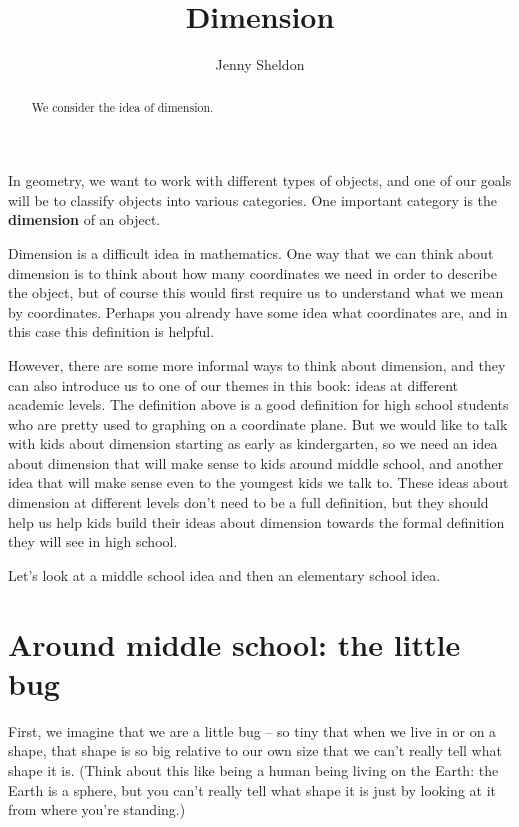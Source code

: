 \documentclass{ximera}
\title{Dimension}
\author{Jenny Sheldon}
\begin{document}
\begin{abstract}
We consider the idea of dimension.
\end{abstract}
\maketitle

In geometry, we want to work with different types of objects, and one of our goals will be to classify objects into various categories. One important category is the {\bf dimension} of an object.

Dimension is a difficult idea in mathematics. One way that we can think about dimension is to think about how many coordinates we need in order to describe the object, but of course this would first require us to understand what we mean by coordinates. Perhaps you already have some idea what coordinates are, and in this case this definition is helpful.

However, there are some more informal ways to think about dimension, and they can also introduce us to one of our themes in this book: ideas at different academic levels. The definition above is a good definition for high school students who are pretty used to graphing on a coordinate plane. But we would like to talk with kids about dimension starting as early as kindergarten, so we need an idea about dimension that will make sense to kids around middle school, and another idea that will make sense even to the youngest kids we talk to. These ideas about dimension at different levels don't need to be a full definition, but they should help us help kids build their ideas about dimension towards the formal definition they will see in high school. 

Let's look at a middle school idea and then an elementary school idea.

\section{Around middle school: the little bug}

First, we imagine that we are a little bug -- so tiny that when we live in or on a shape, that shape is so big relative to our own size that we can't really tell what shape it is. (Think about this like being a human being living on the Earth: the Earth is a sphere, but you can't really tell what shape it is just by looking at it from where you're standing.)
\end{document}
